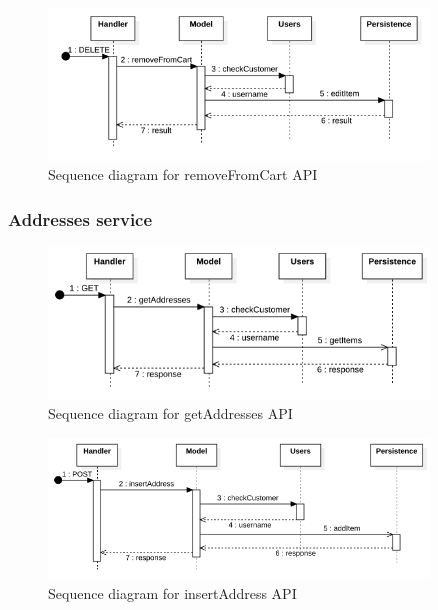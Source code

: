 \begin{figure}[H]
    \includegraphics[width=0.9\textwidth]{res/images/sequence-diagrams/carts/removeFromCart.png}
    \caption{Sequence diagram for removeFromCart API}
\end{figure}

\subsubsection{Addresses service}

\begin{figure}[H]
    \includegraphics[width=0.9\textwidth]{res/images/sequence-diagrams/addresses/getAddresses.png}
    \caption{Sequence diagram for getAddresses API}
\end{figure}

\begin{figure}[H]
    \includegraphics[width=0.9\textwidth]{res/images/sequence-diagrams/addresses/insertAddress.png}
    \caption{Sequence diagram for insertAddress API}
\end{figure}

